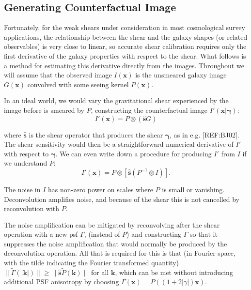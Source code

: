 \documentclass[iop]{emulateapj}
\begin{document}
\subsection{Generating Counterfactual Image}
Fortunately, for the weak shears under consideration in most cosmological survey applications, the relationship between the shear and the galaxy shapes (or related observables) is very close to linear, so accurate shear calibration requires only the first derivative of the galaxy properties with respect to the shear. What follows is a method for estimating this derivative directly from the images. Throughout we will assume that the observed image $I({\mathbf{x}})$ is the unsmeared galaxy image $G(\mathbf{x})$ convolved with some seeing kernel $P(\mathbf{x})$.

In an ideal world, we would vary the gravitational shear experienced by the image before is smeared by $P$, constructing the counterfactual image $I'(\mathbf{x}| {\boldsymbol \gamma})$:
\begin{equation}
  I'({\mathbf{x}}) = P \otimes\left( \hat{\mathbf{s}}G\right)
\end{equation}

where $\hat{\mathbf{s}}$ is the shear operator that produces the shear ${\boldsymbol \gamma}$, as in e.g. [REF:BJ02]. The shear sensitivity would then be a straightforward numerical derivative of $I'$ with respect to ${\boldsymbol \gamma}$. We can even write down a procedure for producing $I'$ from $I$ if we understand $P$:
\begin{equation}
  I'({\mathbf{x}}) = P \otimes \left[ \hat{\mathbf{s}}\left( P^{-1} \otimes I \right)\right].
\end{equation}

The noise in $I$ has non-zero power on scales where $P$ is small or vanishing. Deconvolution amplifies noise, and because of the shear this is not cancelled by reconvolution with $P$. 

The noise amplification can be mitigated by reconvolving after the shear operation with a new psf $\Gamma$, (instead of $P$) and constructing $\Gamma$ so that it suppresses the noise amplification that would normally be produced by the deconvolution operation. All that is required for this is that (in Fourier space, with the tilde indicating the Fourier transformed quantity) $\|\tilde{\Gamma}(\mathbf{|k|}) \| \geq \|\hat{\mathbf{s}} \tilde{P}(\mathbf{k})\|$ for all $\mathbf{k}$, which can be met without introducing additional PSF anisotropy by choosing $\Gamma(\mathbf{x}) = P\left((1+2|\gamma|)\mathbf{x}\right)$.
\end{document}
